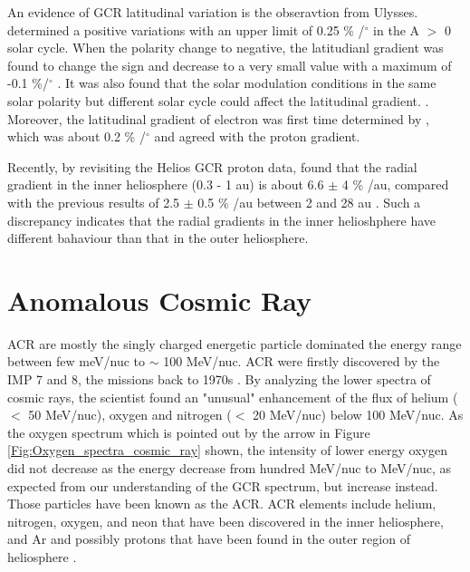 An evidence of \ac{GCR} latitudinal variation is the obseravtion from Ulysses. \citet{Simpson1995GeoRL, Heber1996GeoRL, Heber1996AA} determined a positive variations with an upper limit of 0.25 \% /$^\circ$  in the A $>$ 0 solar cycle. When the polarity change to negative, the latitudianl gradient was found to change the sign and decrease to a very small value with a maximum of -0.1 \%/$^\circ$ \citep{desimone2011ASTRA, Gieseler2016AA}. It was also found that the solar modulation conditions in the same solar polarity but different solar cycle could affect the latitudinal gradient. \citep{Gieseler2016AA, Vos2016SoPh}. Moreover, the latitudinal gradient of electron was first time determined by \citet{Heber2008ApJ}, which was about 0.2 \% /$^\circ$ and agreed with the proton gradient.

Recently, by revisiting the Helios \citep{} \ac{GCR} proton data, \citet{Marquardt2019AA} found that the radial gradient in the inner heliosphere (0.3 - 1 au) is about 6.6 $\pm$ 4 \% /au, compared with the previous results of 2.5 $\pm$ 0.5 \% /au between 2 and 28 au \citep{Webber1981JGR}. Such a discrepancy indicates that the radial gradients in the inner helioshphere have different bahaviour than that in the outer heliosphere.


\section{Anomalous Cosmic Ray}

\ac{ACR} are mostly the singly charged energetic particle dominated the energy range between few meV/nuc to $\sim$ 100 MeV/nuc. \acs{ACR} were firstly discovered by the \acs{IMP} 7 and 8, the missions back to 1970s \citep{Garcia1973ICRC, Hoverstadt1973PhRvL, McDonald1974ApJ}. By analyzing the lower spectra of cosmic rays, the scientist found an "unusual" enhancement of the flux of helium ($<$ 50 MeV/nuc), oxygen and nitrogen ($<$ 20 MeV/nuc) below 100 MeV/nuc. As the oxygen spectrum which is pointed out by the arrow in Figure \ref{Fig:Oxygen_spectra_cosmic_ray} shown, the intensity of lower energy oxygen did not decrease as the energy decrease from hundred MeV/nuc to MeV/nuc, as expected from our understanding of the \ac{GCR} spectrum, but increase instead. Those particles have been known as the \ac{ACR}. \ac{ACR} elements include helium, nitrogen, oxygen, and neon that have been discovered in the inner heliosphere, and Ar and possibly protons that have been found in the outer region of heliosphere \citep{Klecker1995SSRv}.


